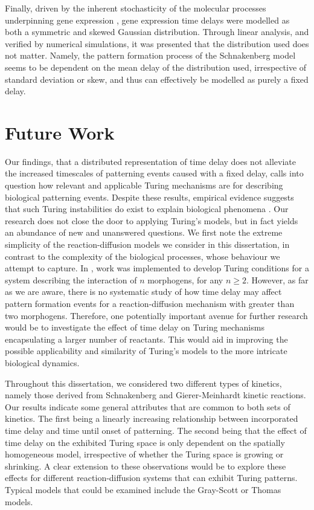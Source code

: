 Finally, driven by the inherent stochasticity of the molecular processes underpinning gene expression \cite{raj,elowitz,mcadams,paulsson}, gene expression time delays were modelled as both a symmetric and skewed Gaussian distribution. Through linear analysis, and verified by numerical simulations, it was presented that the distribution used does not matter. Namely, the pattern formation process of the Schnakenberg model seems to be dependent on the mean delay of the distribution used, irrespective of standard deviation or skew, and thus can effectively be modelled as purely a fixed delay.

\section{Future Work}

Our findings, that a distributed representation of time delay does not alleviate the increased timescales of patterning events caused with a fixed delay, calls into question how relevant and applicable Turing mechanisms are for describing biological patterning events. Despite these results, empirical evidence suggests that such Turing instabilities do exist to explain biological phenomena \cite{yigaffneyli,molecular,miura,miura2,sick}. Our research does not close the door to applying Turing's models, but in fact yields an abundance of new and unanswered questions. We first note the extreme simplicity of the reaction-diffusion models we consider in this dissertation, in contrast to the complexity of the biological processes, whose behaviour we attempt to capture. In \cite{mainigeneral}, work was implemented to develop Turing conditions for a system describing the interaction of $n$ morphogens, for any $n\geq2$. However, as far as we are aware, there is no systematic study of how time delay may affect pattern formation events for a reaction-diffusion mechanism with greater than two morphogens. Therefore, one potentially important avenue for further research would be to investigate the effect of time delay on Turing mechanisms encapsulating a larger number of reactants. This would aid in improving the possible applicability and similarity of Turing's models to the more intricate biological dynamics.

Throughout this dissertation, we considered two different types of kinetics, namely those derived from Schnakenberg and Gierer-Meinhardt kinetic reactions. Our results indicate some general attributes that are common to both sets of kinetics. The first being a linearly increasing relationship between incorporated time delay and time until onset of patterning. The second being that the effect of time delay on the exhibited Turing space is only dependent on the spatially homogeneous model, irrespective of whether the Turing space is growing or shrinking. A clear extension to these observations would be to explore these effects for different reaction-diffusion systems that can exhibit Turing patterns. Typical models that could be examined include the Gray-Scott \cite{grayscott} or Thomas \cite{murray} models.

